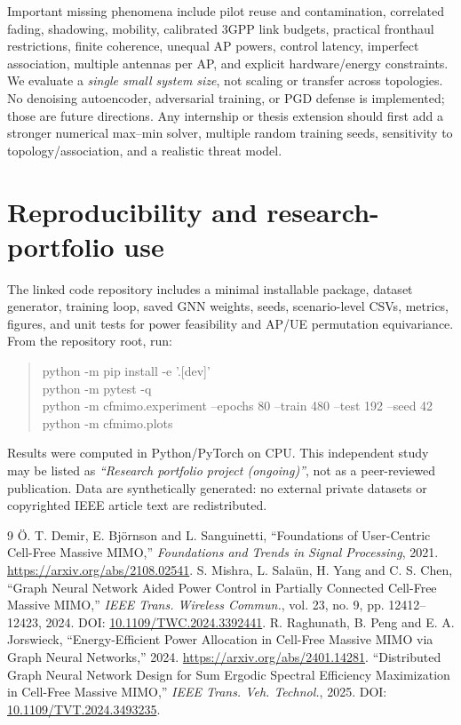 \documentclass[10pt,a4paper]{article}
\newcommand{\sect}[1]{\vspace{3pt}\section{\color{navy}#1}}
\begin{document}
Important missing phenomena include pilot reuse and contamination, correlated fading, shadowing, mobility, calibrated 3GPP link budgets, practical fronthaul restrictions, finite coherence, unequal AP powers, control latency, imperfect association, multiple antennas per AP, and explicit hardware/energy constraints. We evaluate a \emph{single small system size}, not scaling or transfer across topologies. No denoising autoencoder, adversarial training, or PGD defense is implemented; those are future directions. Any internship or thesis extension should first add a stronger numerical max--min solver, multiple random training seeds, sensitivity to topology/association, and a realistic threat model.

\sect{Reproducibility and research-portfolio use}
The linked code repository includes a minimal installable package, dataset generator, training loop, saved GNN weights, seeds, scenario-level CSVs, metrics, figures, and unit tests for power feasibility and AP/UE permutation equivariance. From the repository root, run:
\begin{quote}\ttfamily\small
python -m pip install -e '.[dev]'\\
python -m pytest -q\\
python -m cfmimo.experiment --epochs 80 --train 480 --test 192 --seed 42\\
python -m cfmimo.plots
\end{quote}
Results were computed in Python/PyTorch on CPU. This independent study may be listed as \emph{``Research portfolio project (ongoing)''}, not as a peer-reviewed publication. Data are synthetically generated: no external private datasets or copyrighted IEEE article text are redistributed.

\begin{thebibliography}{9}\small
{} \"O. T. Demir, E. Bj\"ornson and L. Sanguinetti, ``Foundations of User-Centric Cell-Free Massive MIMO,'' \emph{Foundations and Trends in Signal Processing}, 2021. \url{https://arxiv.org/abs/2108.02541}.
 S. Mishra, L. Sala\"un, H. Yang and C. S. Chen, ``Graph Neural Network Aided Power Control in Partially Connected Cell-Free Massive MIMO,'' \emph{IEEE Trans. Wireless Commun.}, vol. 23, no. 9, pp. 12412--12423, 2024. DOI: \href{https://doi.org/10.1109/TWC.2024.3392441}{10.1109/TWC.2024.3392441}.
 R. Raghunath, B. Peng and E. A. Jorswieck, ``Energy-Efficient Power Allocation in Cell-Free Massive MIMO via Graph Neural Networks,'' 2024. \url{https://arxiv.org/abs/2401.14281}.
 ``Distributed Graph Neural Network Design for Sum Ergodic Spectral Efficiency Maximization in Cell-Free Massive MIMO,'' \emph{IEEE Trans. Veh. Technol.}, 2025. DOI: \href{https://doi.org/10.1109/TVT.2024.3493235}{10.1109/TVT.2024.3493235}.
\end{thebibliography}
\end{document}
